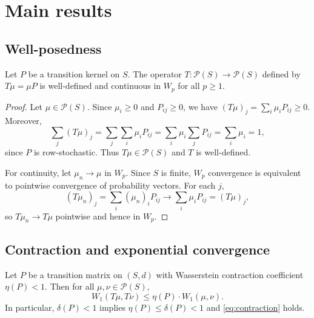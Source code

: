 \section{Main results}\label{sec:results}

\subsection{Well-posedness}

\begin{lemma}\label{lem:wellposed}
Let $P$ be a transition kernel on $S$. The operator
$T \colon \mathcal{P}(S) \to \mathcal{P}(S)$ defined by $T\mu = \mu P$ is
well-defined and continuous in $W_p$ for all $p \ge 1$.
\end{lemma}

\begin{proof}
Let $\mu \in \mathcal{P}(S)$. Since $\mu_i \ge 0$ and $P_{ij} \ge 0$, we
have $(T\mu)_j = \sum_i \mu_i P_{ij} \ge 0$. Moreover,
\[
  \sum_j (T\mu)_j = \sum_j \sum_i \mu_i P_{ij}
  = \sum_i \mu_i \sum_j P_{ij} = \sum_i \mu_i = 1,
\]
since $P$ is row-stochastic. Thus $T\mu \in \mathcal{P}(S)$ and $T$ is
well-defined.

For continuity, let $\mu_n \to \mu$ in $W_p$. Since $S$ is finite, $W_p$
convergence is equivalent to pointwise convergence of probability vectors. For
each $j$,
\[
  (T\mu_n)_j = \sum_i (\mu_n)_i P_{ij} \to \sum_i \mu_i P_{ij} = (T\mu)_j,
\]
so $T\mu_n \to T\mu$ pointwise and hence in $W_p$.
\end{proof}

\subsection{Contraction and exponential convergence}

\begin{lemma}\label{lem:contraction}
Let $P$ be a transition matrix on $(S, d)$ with Wasserstein contraction
coefficient $\eta(P) < 1$. Then for all $\mu, \nu \in \mathcal{P}(S)$,
\begin{equation}\label{eq:contraction}
  W_1(T\mu, T\nu) \le \eta(P) \cdot W_1(\mu, \nu).
\end{equation}
In particular, $\delta(P) < 1$ implies $\eta(P) \le \delta(P) < 1$ and
\eqref{eq:contraction} holds.
\end{lemma}

